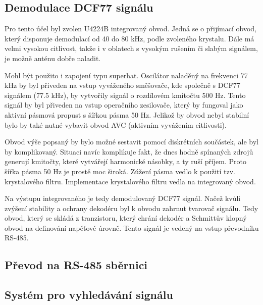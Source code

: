 \subsection{Demodulace DCF77 signálu}
    Pro tento účel byl zvolen U4224B integrovaný obvod. Jedná se o přijímací obvod, který
    disponuje demodulací od 40 do 80 kHz, podle zvoleného krystalu. Dále má velmi vysokou
    citlivost, takže i v oblatech s vysokým rušením či slabým signálem, je možně anténu
    dobře naladit.

    Mohl být použito i zapojení typu superhat. Oscilátor naladěný na frekvenci 77 kHz by
    byl přiveden na vstup vyváženého směšovače, kde společně s DCF77 signálem (77.5 kHz),
    by vytvořily signál o rozdílovém kmitočtu 500 Hz. Tento signál by byl přiveden na
    vstup operačního zesilovače, který by fungoval jako aktivní pásmová propust s šířkou
    pásma 50 Hz. Jelikož by obvod nebyl stabilní bylo by také nutné vybavit obvod AVC
    (aktivním vyvážením citlivosti).

    Obvod výše popsaný by bylo možné sestavit pomocí diskrétních součástek, ale byl by
    komplikovaný. Situaci navíc komplikuje fakt, že dnes hodně spínaných zdrojů generují
    kmitočty, které vytvářejí harmonické násobky, a ty ruší příjem. Proto šířka pásma 50
    Hz je prostě moc široká. Zúžení pásma vedlo k použití tzv. krystalového filtru.
    Implementace krystalového filtru vedla na integrovaný obvod.

    Na výstupu integrovaného je tedy demodulovaný DCF77 signál. Načež kvůli zvýšení
    stability a ochrany dekodéru byl k obvodu zahrnut tvarovač signálu. Tedy obvod, který
    se skládá z tranzistoru, který chrání dekodér a Schmittův klopný obvod na definování
    napěťové úrovně. Tento signál je vedený na vstup převodníku RS-485.

\subsection{Převod na RS-485 sběrnici}
\subsection{Systém pro vyhledávání signálu}
